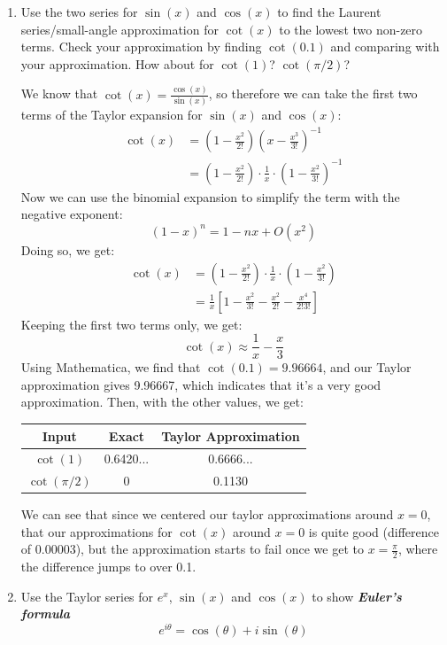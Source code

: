 \documentclass[10pt]{article}
\begin{document}
	\begin{enumerate}[label=\alph*),resume ]
		\item Use the two series for $\sin(x)$ and $\cos(x)$ to find the Laurent series/small-angle approximation
			for $\cot(x)$ to the lowest two non-zero terms. Check your approximation by finding $\cot(0.1)$ and
			comparing with your approximation. How about for $\cot(1)$? $\cot(\pi/2)$?

			\begin{solution}
				We know that $\cot(x) = \frac{\cos(x)}{\sin(x)}$, so therefore we can take the first two 
				terms of the Taylor expansion for $\sin(x)$ and $\cos(x)$:
				\begin{align*}
					\cot(x) &= \left(1 - \frac{x^2}{2!}\right)\left(x - \frac{x^3}{3!}\right)^{-1} \\
							&= \left( 1 - \frac{x^2}{2!} \right) \cdot \frac{1}{x} \cdot 
							\left( 1 - \frac{x^2}{3!} \right)^{-1}
				\end{align*}
				Now we can use the binomial expansion to simplify the term with the negative exponent: 
				\[
					(1 - x)^{n} = 1 - nx + O(x^2)
				\] 
				Doing so, we get:
				\begin{align*}
					\cot(x) &=  \left( 1 - \frac{x^2}{2!} \right) \cdot \frac{1}{x} \cdot 
					\left(1 - \frac{x^2}{3!}\right) \\
							&= \frac{1}{x}\left[1 - \frac{x^2}{3!} - \frac{x^2}{2!} - \frac{x^4}{2!3!}\right]
				\end{align*}
				Keeping the first two terms only, we get:
				\[
				\cot(x) \approx \frac{1}{x} - \frac{x}{3}
				\] 
				Using Mathematica, we find that $\cot(0.1) = 9.96664$, and our Taylor approximation gives
				9.96667, which indicates that it's a very good approximation. Then, with the other values, we 
				get:

				\begin{center}
					\begin{tabular}{c|c|c}
						Input         & Exact     & Taylor Approximation \\ \hline
						$\cot(1)$     & 0.6420... & 0.6666...            \\ \hline
						$\cot(\pi/2)$ & 0         & 0.1130              
					\end{tabular}
				\end{center}
				We can see that since we centered our taylor approximations around $x = 0$, that our 
				approximations for $\cot(x)$ around $x = 0$ is quite good (difference of 0.00003), but the
				approximation starts to fail 
				once we get to $x= \frac{\pi}{2}$, where the difference jumps to over 0.1.
			\end{solution}
		\item Use the Taylor series for $e^x$, $\sin(x)$ and $\cos(x)$ to show \textbf{\textit{Euler's formula}}
			\[
				e^{i \theta} = \cos(\theta) + i \sin(\theta)
			\] 


\end{enumerate}
\end{document}
